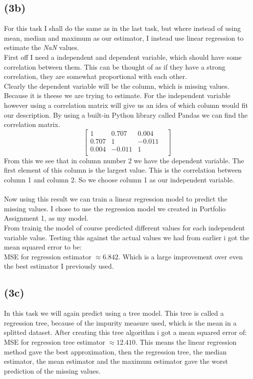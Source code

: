 \documentclass[12pt, letterpaper]{article}
\begin{document}
    \subsection*{(3b)}
      For this task I shall do the same as in the last task, but where instead of using mean, median and maximum as our estimator, I instead use linear regression to estimate the \textit{NaN} values.\\
      First off I need a independent and dependent variable, which should have some correlation between them. This can be thought of as if they have a strong correlation, they are somewhat proportional with each other.\\
      Clearly the dependent variable will be the column, which is missing values. Because it is theese we are trying to estimate. For the independent variable however using a correlation matrix will give us an idea of which column would fit our description. By using a built-in Python library called Pandas we can find the correlation matrix.\\
      \[
      \begin{bmatrix}
        1&            0.707&     0.004&\\
        0.707&           1&     -0.011&\\
        0.004&      -0.011&        1&  \\
      \end{bmatrix}
      \]
      From this we see that in column number 2 we have the dependent variable. The first element of this column is the largest value. This is the correlation between column 1 and column 2. So we choose column 1 as our independent variable.\\
      \\
      Now using this result we can train a linear regression model to predict the missing values. I chose to use the regression model we created in Portfolio Assignment 1, as my model.\\
      From trainig the model of course predicted different values for each independent variable value. Testing this against the actual values we had from earlier i got the mean squared error to be:\\
      MSE for regression estimator $\approx 6.842$. Which is a large improvement over even the best estimator I previously used.
    \subsection*{(3c)}
      In this task we will again predict using a tree model. This tree is called a regression tree, because of the impurity measure used, which is the mean in a splitted dataset. After creating this tree algorithm i got a mean squared error of:\\
      MSE for regression tree estimator $\approx 12.410$. This means the linear regression method gave the best approximation, then the regression tree, the median estimator, the mean estimator and the maximum estimator gave the worst prediction of the missing values.
\end{document}
